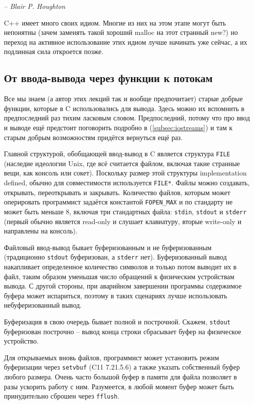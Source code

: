 \documentclass[a4paper,12pt,oneside]{book}
\begin{document}
\hfill\textit{-- Blair P. Houghton}

C++ имеет много своих идиом. Многие из них на этом этапе могут быть непонятны (зачем заменять такой хороший malloc на этот странный new?) но переход на активное использование этих идиом лучше начинать уже сейчас, а их подлинная сила откроется позже.

\subsection{От ввода-вывода через функции к потокам}\label{PrintfToCout}

Все мы знаем (а автор этих лекций так и вообще предпочитает) старые добрые функции, которые в C использовались для вывода. Здесь можно их вспомнить в предпоследний раз тихим ласковым словом. Предпоследний, потому что про ввод и выводе ещё предстоит поговорить подробно в (\ref{subsec:iostreams}) и там к старым добрым возможностям придётся вернуться ещё раз.

Главной структурой, обобщающей ввод-вывод в C является структура \lstinline!FILE! (наследие идеологии Unix, где всё считается файлом, включая такие странные вещи, как консоль или сокет). Поскольку размер этой структуры implementation defined, обычно для совместимости используется \lstinline!FILE*!. Файлы можно создавать, открывать, переоткрывать и закрывать. Количество файлов, которым может оперировать программист задаётся константой \lstinline!FOPEN_MAX! и по стандарту не может быть меньше 8, включая три стандартных файла: \lstinline!stdin!, \lstinline!stdout! и \lstinline!stderr! (первый обычно является read-only и слушает клавиатуру, вторые write-only и направлены на консоль).

Файловый ввод-вывод бывает буферизованным и не буферизованным (традиционно \lstinline!stdout! буферизован, а \lstinline!stderr! нет). Буферизованный вывод накапливает определенное количество символов и только потом выводит их в файл, таким образом уменьшая число обращений к физическим устройствам вывода. С другой стороны, при аварийном завершении программы содержимое буфера может испариться, поэтому в таких сценариях лучше использовать небуферизованный вывод.

Буферизация в свою очередь бывает полной и построчной. Скажем, \lstinline!stdout! буферизован построчно -- вывод конца строки сбрасывает буфер на физическое устройство.

Для открываемых вновь файлов, программист может установить режим буферизации через \lstinline!setvbuf! (C11 7.21.5.6) а также указать собственный буфер любого размера. Очень часто большой буфер в памяти для файла позволяет в разы ускорить работу с ним. Разумеется, в любой момент буфер может быть принудительно сброшен через \lstinline!fflush!.
\end{document}
